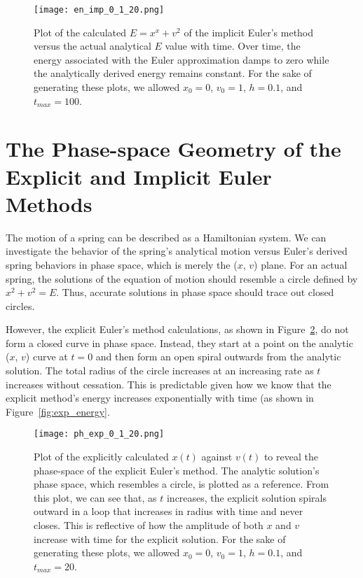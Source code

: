 \documentclass{article}
\begin{document}
\begin{figure}
    \centering
    \texttt{[image: en\_imp\_0\_1\_20.png]}{}
    \caption{Plot of the calculated $E = x^x + v^2$ of the implicit Euler's method versus the actual analytical $E$ value with time.  Over time, the energy associated with the Euler approximation damps to zero while the analytically derived energy remains constant.  For the sake of generating these plots, we allowed $x_0 = 0$, $v_0 = 1$, $h = 0.1$, and $t_{max} = 100$.}
    \label{fig:imp_energy}
\end{figure}

\section{The Phase-space Geometry of the Explicit and Implicit Euler Methods}

The motion of a spring can be described as a Hamiltonian system.  We can investigate the behavior of the spring's analytical motion versus Euler's derived spring behaviors in phase space, which is merely the ($x$, $v$) plane.  For an actual spring, the solutions of the equation of motion should resemble a circle defined by $x^2 + v^2 = E$.  Thus, accurate solutions in phase space should trace out closed circles.

However, the explicit Euler's method calculations, as shown in Figure~\ref{fig:exp_pspace}, do not form a closed curve in phase space.  Instead, they start at a point on the analytic ($x$, $v$) curve at $t = 0$ and then form an open spiral outwards from the analytic solution.  The total radius of the circle increases at an increasing rate as $t$ increases without cessation.  This is predictable given how we know that the explicit method's energy increases exponentially with time (as shown in Figure~\ref{fig:exp_energy}.

\begin{figure}
    \centering
    \texttt{[image: ph\_exp\_0\_1\_20.png]}{}
    \caption{Plot of the explicitly calculated $x(t)$ against $v(t)$ to reveal the phase-space of the explicit Euler's method.  The analytic solution's phase space, which resembles a circle, is plotted as a reference.  From this plot, we can see that, as $t$ increases, the explicit solution spirals outward in a loop that increases in radius with time and never closes.  This is reflective of how the amplitude of both $x$ and $v$ increase with time for the explicit solution.  For the sake of generating these plots, we allowed $x_0 = 0$, $v_0 = 1$, $h = 0.1$, and $t_{max} = 20$.}
    \label{fig:exp_pspace}
\end{figure}
\end{document}
